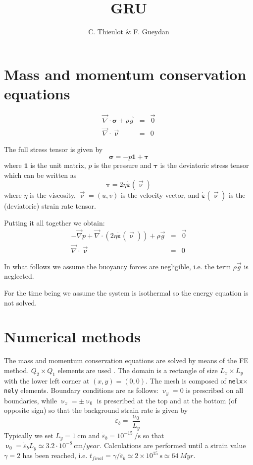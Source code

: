 \documentclass[a4paper]{article}
\title{GRU}
\author{C. Thieulot \& F. Gueydan}
\begin{document}
\maketitle



\section{Mass and momentum conservation equations}


\begin{eqnarray}
\vec\nabla \cdot \bm \sigma + \rho \vec{g} &=& \vec{0} \\
\vec\nabla \cdot \vec\upnu &=& 0
\end{eqnarray}

The full stress tensor is given by
\[
\bm\sigma = -p {\bm 1} +  \bm \tau
\]
where ${\bm 1}$ is the unit matrix, $p$ is the pressure and 
${\bm\tau}$ is the deviatoric stress tensor which can be 
written as
\[
\bm\tau = 2 \eta \dot{\bm \varepsilon}(\vec\upnu)
\]
where $\eta$ is the viscosity, $\vec{\upnu}=(u,v)$ is the velocity vector, 
and $\dot{\bm \varepsilon}(\vec\upnu)$ is the (deviatoric) 
strain rate tensor.

Putting it all together we obtain:
\begin{eqnarray}
-\vec\nabla p + \vec\nabla \cdot (2 \eta \dot{\bm \varepsilon}(\vec\upnu)) + \rho \vec{g} &=& \vec{0} \\
\vec\nabla \cdot \vec\upnu &=& 0
\end{eqnarray}

In what follows we assume the buoyancy forces are negligible, i.e. 
the term $\rho \vec{g}$ is neglected.

For the time being we assume the system is isothermal 
so the energy equation is not solved.


\section{Numerical methods}

The mass and momentum conservation equations are 
solved by means of the FE method. 
$Q_2\times Q_1$ elements are used \cite{thba22}.
The domain is a rectangle of size $L_x \times L_y$
with the lower left corner at $(x,y)=(0,0)$.
The mesh is composed of \lstinline{nelx}$\times$\lstinline{nely} elements.
Boundary conditions are as follows: $\upnu_y=0$ is prescribed on 
all boundaries, while $\upnu_x=\pm \upnu_0$ is prescribed at the 
top and at the bottom (of opposite sign) so that the background 
strain rate is given by 
\[
\dot\varepsilon_b = \frac{\upnu_0}{L_y}
\]
Typically we set $L_y=1~\si{\cm}$ and 
$\dot\varepsilon_b =10^{-15}~\si{\per\second} $ so that 
$\upnu_0= \dot\varepsilon_b L_y \simeq 3.2\cdot 10^{-8}~\si{\cm\per year}$.
Calculations are performed until a strain value $\gamma=2$ 
has been reached, i.e. 
$t_{final} = \gamma/ \dot\varepsilon_b \simeq 2 \times 10^{15}~\si{\second} 
\simeq 64~\si{Myr}$.
\end{document}
